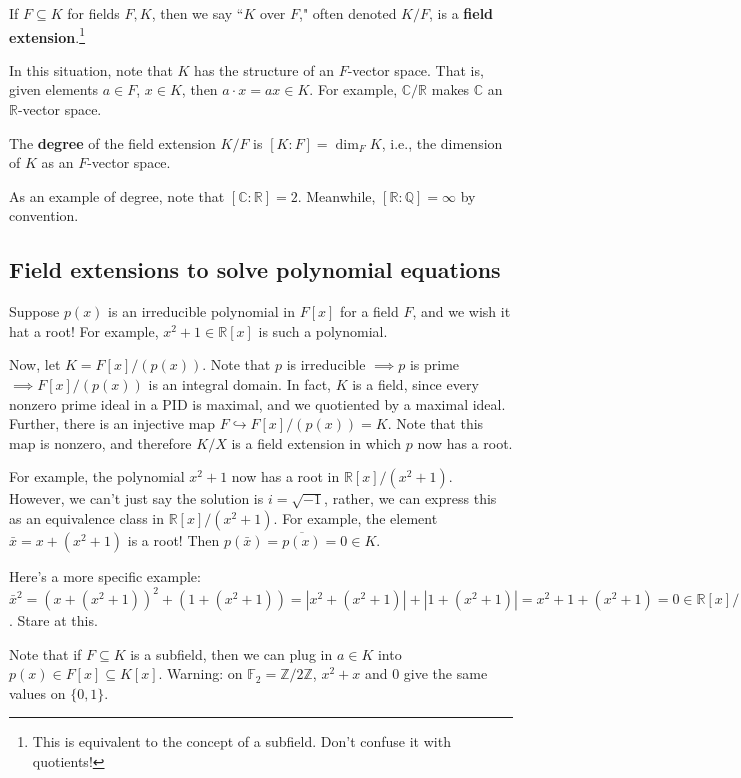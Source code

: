 \documentclass{article}
\theoremstyle{plain}
\newcommand{\Q}{\mathbb{Q}}
\newcommand{\R}{\mathbb{R}}
\newcommand{\C}{\mathbb{C}}
\newcommand{\Z}{\mathbb{Z}}
\newcommand{\on}[1]{\operatorname{#1}}
\begin{document}
\begin{definition}{}{}
If $F \subseteq K$ for fields $F,K$, then we say ``$K$ over $F$," often denoted $K/F$, is a \textbf{field extension}.\footnote{This is equivalent to the concept of a subfield. Don't confuse it with quotients!}
\end{definition}
In this situation, note that $K$ has the structure of an $F$-vector space. That is, given elements $a \in F$, $x \in K$, then $a\cdot x = ax \in K$. For example, $\C/\R$ makes $\C$ an $\R$-vector space.

\begin{definition}{}{}
	The \textbf{degree} of the field extension $K/F$ is $[K : F] = \on{dim}_FK$, i.e., the dimension of $K$ as an $F$-vector space.
\end{definition}
As an example of degree, note that $[\C : \R] = 2$. Meanwhile, $[\R : \Q] = \infty$ by convention.

\subsection{Field extensions to solve polynomial equations}
Suppose $p(x)$ is an irreducible polynomial in $F[x]$ for a field $F$, and we wish it hat a root! For example, $x^2 + 1 \in \R[x]$ is such a polynomial.

Now, let $K = F[x]/(p(x))$. Note that $p$ is irreducible $\implies p$ is prime $\implies F[x]/(p(x))$ is an integral domain. In fact, $K$ is a field, since every nonzero prime ideal in a PID is maximal, and we quotiented by a maximal ideal. Further, there is an injective map $F \hookrightarrow F[x]/(p(x)) = K$. Note that this map is nonzero, and therefore $K/X$ is a field extension in which $p$ now has a root.

For example, the polynomial $x^2 + 1$ now has a root in $\R[x]/(x^2 + 1)$. However, we can't just say the solution is $i = \sqrt{-1}$, rather, we can express this as an equivalence class in $\R[x]/(x^2 + 1)$. For example, the element $\bar{x} = x + (x^2 + 1)$ is a root! Then $p(\bar{x}) = \overline{p(x)} = 0 \in K$.

Here's a more specific example: $\bar{x}^2 = (x + (x^2 + 1))^2 + (1 + (x^2 + 1)) = |x^2 + (x^2 + 1)| + |1 + (x^2 + 1)| = x^2 + 1 + (x^2 + 1) = 0 \in \R[x]/(x^2+1)$. Stare at this.

Note that if $F \subseteq K$ is a subfield, then we can plug in $a \in K$ into $p(x) \in F[x] \subseteq K[x]$.
Warning: on $\mathbb{F}_2 = \Z/2\Z$, $x^2 + x$ and $0$ give the same values on $\{ 0,1 \}$.
\end{document}
